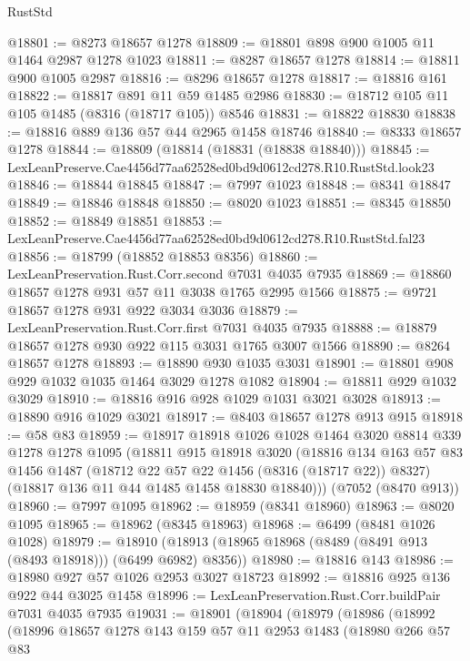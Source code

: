 \begin{lexlean}{RustStd}
\begin{coremodule}
@18801 := @8273 @18657 @1278
@18809 := @18801 @898 @900 @1005 @11 @1464 @2987 @1278 @1023
@18811 := @8287 @18657 @1278
@18814 := @18811 @900 @1005 @2987
@18816 := @8296 @18657 @1278
@18817 := @18816 @161
@18822 := @18817 @891 @11 @59 @1485 @2986
@18830 := @18712 @105 @11 @105 @1485 (@8316 (@18717 @105)) @8546
@18831 := @18822 @18830
@18838 := @18816 @889 @136 @57 @44 @2965 @1458 @18746
@18840 := @8333 @18657 @1278
@18844 := @18809 (@18814 (@18831 (@18838 @18840)))
@18845 := LexLeanPreserve.Cae4456d77aa62528ed0bd9d0612cd278.R10.RustStd.look23
@18846 := @18844 @18845
@18847 := @7997 @1023
@18848 := @8341 @18847
@18849 := @18846 @18848
@18850 := @8020 @1023
@18851 := @8345 @18850
@18852 := @18849 @18851
@18853 := LexLeanPreserve.Cae4456d77aa62528ed0bd9d0612cd278.R10.RustStd.fal23
@18856 := @18799 (@18852 @18853 @8356)
@18860 := LexLeanPreservation.Rust.Corr.second @7031 @4035 @7935
@18869 := @18860 @18657 @1278 @931 @57 @11 @3038 @1765 @2995 @1566
@18875 := @9721 @18657 @1278 @931 @922 @3034 @3036
@18879 := LexLeanPreservation.Rust.Corr.first @7031 @4035 @7935
@18888 := @18879 @18657 @1278 @930 @922 @115 @3031 @1765 @3007 @1566
@18890 := @8264 @18657 @1278
@18893 := @18890 @930 @1035 @3031
@18901 := @18801 @908 @929 @1032 @1035 @1464 @3029 @1278 @1082
@18904 := @18811 @929 @1032 @3029
@18910 := @18816 @916 @928 @1029 @1031 @3021 @3028
@18913 := @18890 @916 @1029 @3021
@18917 := @8403 @18657 @1278 @913 @915
@18918 := @58 @83
@18959 := @18917
    @18918
    @1026
    @1028
    @1464
    @3020
    @8814
    @339
    @1278
    @1278
    @1095
    (@18811
      @915
      @18918
      @3020
      (@18816
        @134
        @163
        @57
        @83
        @1456
        @1487
        (@18712 @22 @57 @22 @1456 (@8316 (@18717 @22)) @8327)
        (@18817 @136 @11 @44 @1485 @1458 @18830 @18840)))
    (@7052 (@8470 @913))
@18960 := @7997 @1095
@18962 := @18959 (@8341 @18960)
@18963 := @8020 @1095
@18965 := @18962 (@8345 @18963)
@18968 := @6499 (@8481 @1026 @1028)
@18979 := @18910 (@18913 (@18965 @18968 (@8489 (@8491 @913 (@8493 @18918))) (@6499 @6982) @8356))
@18980 := @18816 @143
@18986 := @18980 @927 @57 @1026 @2953 @3027 @18723
@18992 := @18816 @925 @136 @922 @44 @3025 @1458
@18996 := LexLeanPreservation.Rust.Corr.buildPair @7031 @4035 @7935
@19031 := @18901
    (@18904
      (@18979
        (@18986
          (@18992
            (@18996
              @18657
              @1278
              @143
              @159
              @57
              @11
              @2953
              @1483
              (@18980
                @266
                @57
                @83

\end{coremodule}
\end{lexlean}
